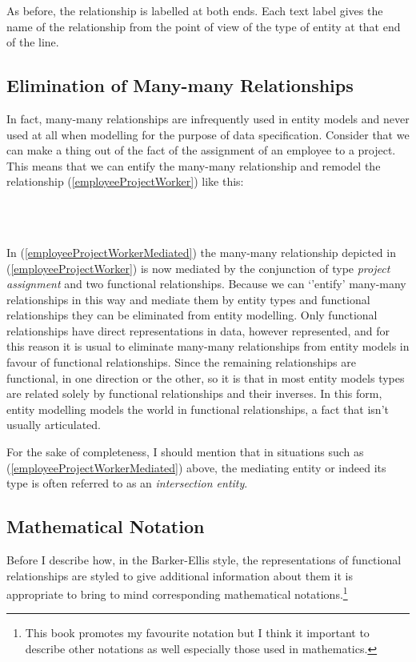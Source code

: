 \begin{gather}
\label{employeeProjectWorker}
\raisebox{-1cm}{

}
\end{gather}

\noindent As before, the relationship is labelled at both ends. Each text label gives the name of the relationship from the point of view of the type of entity at that end of the line.

\subsection*{Elimination of Many-many Relationships}
\noindent In fact, many-many relationships are infrequently used in entity models and never used at all when modelling for the purpose of data specification.
Consider that we can make a thing out of the fact of the assignment of an employee to a project. This means that we can entify the many-many relationship and remodel the relationship (\ref{employeeProjectWorker}) like this:
\begin{gather}
\label{employeeProjectWorkerMediated}
\raisebox{-1cm}{

}
\end{gather}
\noindent
In (\ref{employeeProjectWorkerMediated}) the  many-many relationship depicted in (\ref{employeeProjectWorker}) is now mediated by the conjunction of  type
\textit{project assignment} and two functional relationships. Because we can `'entify' many-many relationships in this way and mediate them by entity types and functional relationships they can be eliminated from entity modelling. Only functional relationships have direct representations in data, however represented, and for this reason it is usual to eliminate many-many relationships from entity models in favour of functional relationships. Since the remaining relationships are functional, in one direction or the other, so it is that in most entity models types are related solely by functional relationships and their inverses. In this form, entity modelling models the world in functional relationships, a fact that isn't usually articulated.

\mynote For the sake of completeness, I should mention that in situations
such as (\ref{employeeProjectWorkerMediated}) above, the mediating entity or indeed its type is often referred to as an \textit{intersection entity}.

\subsection*{Mathematical Notation}
\mynote
Before I describe how, in the Barker-Ellis style, the representations of functional relationships are styled to give additional information about them
 it is appropriate to bring to mind corresponding mathematical notations.\footnote{This book promotes my favourite notation but I think it important to describe other notations as well especially those used in mathematics.}

